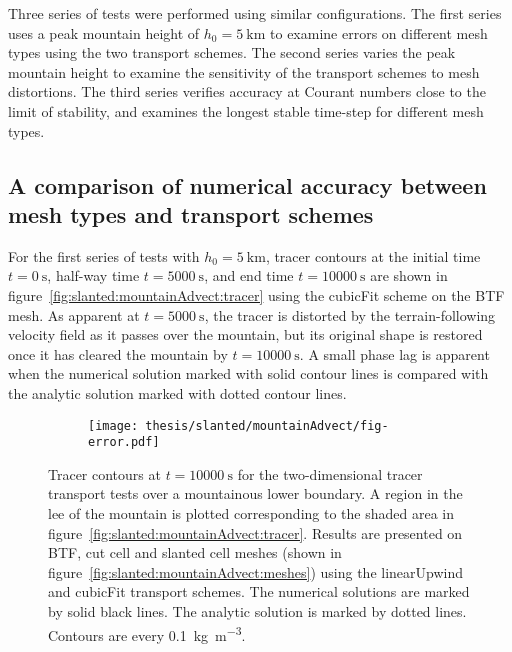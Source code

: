 Three series of tests were performed using similar configurations.  The first series uses a peak mountain height of $h_0 = \SI{5}{\kilo\meter}$ to examine errors on different mesh types using the two transport schemes.
The second series varies the peak mountain height to examine the sensitivity of the transport schemes to mesh distortions.
The third series verifies accuracy at Courant numbers close to the limit of stability, and examines the longest stable time-step for different mesh types.

\subsection{A comparison of numerical accuracy between mesh types and transport schemes}
For the first series of tests with $h_0 = \SI{5}{\kilo\meter}$, tracer contours at the initial time $t=\SI{0}{\second}$, half-way time $t=\SI{5000}{\second}$, and end time $t=\SI{10000}{\second}$ are shown in figure~\ref{fig:slanted:mountainAdvect:tracer} using the cubicFit scheme on the BTF mesh.  As apparent at $t=\SI{5000}{\second}$, the tracer is distorted by the terrain-following velocity field as it passes over the mountain, but its original shape is restored once it has cleared the mountain by $t=\SI{10000}{\second}$.
A small phase lag is apparent when the numerical solution marked with solid contour lines is compared with the analytic solution marked with dotted contour lines.

\begin{figure}
	\begin{subfigure}{\textwidth}
		\centering
		\label{fig:slanted:mountainAdvect:errors:linearUpwind-btf}
		\label{fig:slanted:mountainAdvect:errors:linearUpwind-cutCell}
		\label{fig:slanted:mountainAdvect:errors:linearUpwind-slantedCell}
		\label{fig:slanted:mountainAdvect:errors:cubicFit-btf}
		\label{fig:slanted:mountainAdvect:errors:cubicFit-cutCell}
		\label{fig:slanted:mountainAdvect:errors:cubicFit-slantedCell}
		\texttt{[image: thesis/slanted/mountainAdvect/fig-error.pdf]}
	\end{subfigure}

	\caption{Tracer contours at $t=\SI{10000}{\second}$ for the two-dimensional tracer transport tests over a mountainous lower boundary.  A region in the lee of the mountain is plotted corresponding to the shaded area in figure~\ref{fig:slanted:mountainAdvect:tracer}.
	Results are presented on BTF, cut cell and slanted cell meshes (shown in figure~\ref{fig:slanted:mountainAdvect:meshes}) using the linearUpwind and cubicFit transport schemes.  The numerical solutions are marked by solid black lines.  The analytic solution is marked by dotted lines.  Contours are every \SI{0.1}{\kilo\gram\per\meter\cubed}.}
	\label{fig:slanted:mountainAdvect:errors}
\end{figure}

